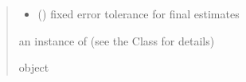 \documentclass[letterpaper,10pt,english]{sphinxmanual}
\begin{document}
\begin{fulllineitems}
\begin{quote}
\begin{description}
\begin{itemize}
\item {} 
\sphinxAtStartPar
{} () \textendash{} fixed error tolerance for final estimates

\end{itemize}

\sphinxAtStartPar
an instance of  (see the Class for details)

\sphinxAtStartPar
object

\end{description}\end{quote}

\end{fulllineitems}

\end{document}
